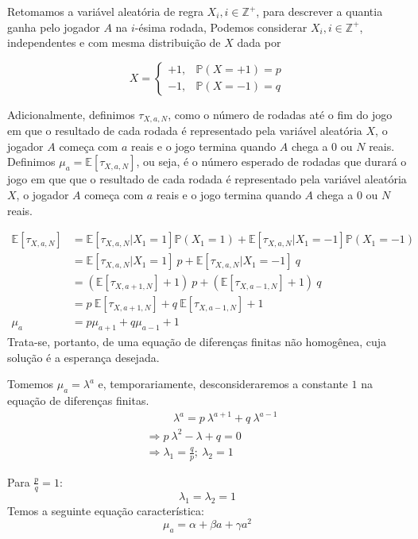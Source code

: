 \documentclass[
  brazilian,
  12pt,
]{article}
\theoremstyle{definition}
\theoremstyle{definition}
\theoremstyle{remark}
\begin{document}
Retomamos a variável aleatória de regra \(X_i, i \in \mathbb{Z}^+\),
para descrever a quantia ganha pelo jogador \(A\) na \(i\)-ésima rodada,
Podemos considerar \(X_i, i \in \mathbb{Z}^+\), independentes e com
mesma distribuição de \(X\) dada por

\[
X = \begin{cases}
    +1, & \mathbb{P}(X=+1)=p \\
    -1, & \mathbb{P}(X=-1)=q
\end{cases}
\]

Adicionalmente, definimos \(\tau_{X,a,N}\), como o número de rodadas até
o fim do jogo em que o resultado de cada rodada é representado pela
variável aleatória \(X\), o jogador \(A\) começa com \(a\) reais e o
jogo termina quando \(A\) chega a \(0\) ou \(N\) reais. Definimos
\(\mu_{a} = \mathbb{E}[\tau_{X,a,N}]\), ou seja, é o número esperado de
rodadas que durará o jogo em que que o resultado de cada rodada é
representado pela variável aleatória \(X\), o jogador \(A\) começa com
\(a\) reais e o jogo termina quando \(A\) chega a \(0\) ou \(N\) reais.

\[
\begin{aligned}
\mathbb{E}[\tau_{X, a, N}]
&= \mathbb{E}[\tau_{X, a, N}|X_1=1] \mathbb{P}(X_1=1)+\mathbb{E}[\tau_{X, a, N}|X_1=-1] \mathbb{P}(X_1=-1) \\
&= \mathbb{E}[\tau_{X, a, N}|X_1=1] \: p + \mathbb{E}[\tau_{X, a, N}|X_1=-1] \: q \\
&= (\mathbb{E}[\tau_{X, a+1,N}]+1) \: p + (\mathbb{E}[\tau_{X, a-1,N}]+1) \: q \\
&= p \: \mathbb{E}[\tau_{X, a+1,N}] + q \: \mathbb{E}[\tau_{X, a-1,N}] + 1 \\
\mu_{a} &= p \mu_{a+1} + q \mu_{a-1} + 1  
\end{aligned}
\] Trata-se, portanto, de uma equação de diferenças finitas não
homogênea, cuja solução é a esperança desejada.

Tomemos \(\mu_{a} = \lambda ^a\) e, temporariamente, desconsideraremos a
constante \(1\) na equação de diferenças finitas. \[
\begin{aligned}
& \phantom{\Rightarrow;;}\lambda ^a = p \:  \lambda ^{a+1} + q \: \lambda ^{a-1} \\
& \Rightarrow p \:  \lambda ^ 2 -\lambda + q = 0 \\
& \Rightarrow \lambda_1 = \frac{q}{p}; \:  \lambda_2 = 1
\end{aligned}
\]

Para \(\frac{p}{q} = 1\): \[
\lambda_1 = \lambda_2 = 1
\] Temos a seguinte equação característica: \[
\mu_{a} = \alpha + \beta a + \gamma a^2
\]
\end{document}
